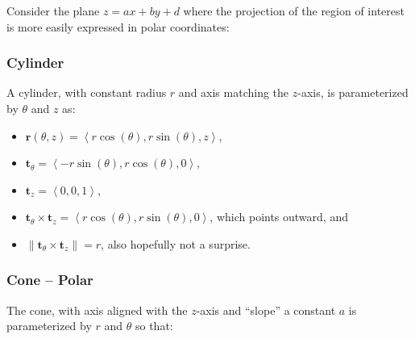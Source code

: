 \documentclass[10pt]{article}
\newcommand{\mb}[1]{\mathbf{#1}}
\newcommand{\brackett}[1]{\left\langle #1 \right\rangle}
\newcommand{\vecfuc}[2]{\mb{#1}(#2)}
\newcommand{\mysqrt}[1]{%
  \mathpalette\foo{#1}%
}
\newcommand{\foo}[2]{%
  \sbox0{$#1\sqrt{#2}$}%
  \begin{tikzpicture}[baseline=(sqrt.base)]
    \node[inner sep=0, outer sep=0] (sqrt) {$#1\sqrt{#2}$}; %
    \draw([yshift=-0.045em]sqrt.north east) -- ++(0,-0.5ex); %
  \end{tikzpicture}%
}
\begin{document}
Consider the plane \(z = ax + by + d\) where the projection of the region of interest is more easily expressed in polar coordinates:

\subsubsection*{Cylinder}

A cylinder, with constant radius \(r\) and axis matching the \(z\)-axis, is parameterized by \(\theta\) and \(z\) as:
\begin{itemize}
    \item \(\vecfuc{r}{\theta,z} = \brackett{r \cos(\theta), r \sin(\theta), z}\),
    \item \(\mb{t}_{\theta} = \brackett{-r \sin(\theta), r \cos(\theta), 0}\),
    \item \(\mb{t}_{z} = \brackett{0, 0, 1}\),
    \item \(\mb{t}_{\theta} \times \mb{t}_{z} = \brackett{r \cos(\theta), r \sin(\theta), 0}\), which points outward, and
    \item \(\| \mb{t}_{\theta} \times \mb{t}_{z} \| = r\), also hopefully not a surprise.
\end{itemize}

\subsubsection*{Cone -- Polar}

The cone, with axis aligned with the \(z\)-axis and ``slope'' a constant \(a\) is parameterized by \(r\) and \(\theta\) so that:
\end{document}
